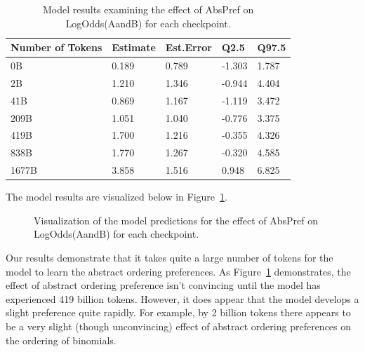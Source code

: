 \documentclass[
  10pt,
  nohyperref]{acl}
\begin{document}
\begin{longtable}[]{@{}lllll@{}}

\caption{\label{tbl-exp2m1}Model results examining the effect of AbsPref
on LogOdds(AandB) for each checkpoint.}

\tabularnewline

\toprule\noalign{}
Number of Tokens & Estimate & Est.Error & Q2.5 & Q97.5 \\
\midrule\noalign{}
\endhead
\bottomrule\noalign{}
\endlastfoot
0B & 0.189 & 0.789 & -1.303 & 1.787 \\
2B & 1.210 & 1.346 & -0.944 & 4.404 \\
41B & 0.869 & 1.167 & -1.119 & 3.472 \\
209B & 1.051 & 1.040 & -0.776 & 3.375 \\
419B & 1.700 & 1.216 & -0.355 & 4.326 \\
838B & 1.770 & 1.267 & -0.320 & 4.585 \\
1677B & 3.858 & 1.516 & 0.948 & 6.825 \\

\end{longtable}

The model results are visualized below in Figure~\ref{fig-exp2m1}.

\begin{figure}


\caption{\label{fig-exp2m1}Visualization of the model predictions for
the effect of AbsPref on LogOdds(AandB) for each checkpoint.}

\end{figure}%

Our results demonstrate that it takes quite a large number of tokens for
the model to learn the abstract ordering preferences. As
Figure~\ref{fig-exp2m1} demonstrates, the effect of abstract ordering
preference isn't convincing until the model has experienced 419 billion
tokens. However, it does appear that the model develops a slight
preference quite rapidly. For example, by 2 billion tokens there appears
to be a very slight (though unconvincing) effect of abstract ordering
preferences on the ordering of binomials.
\end{document}
